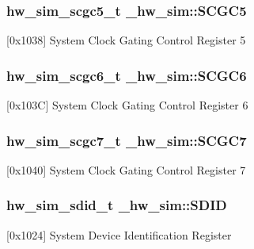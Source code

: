 \subsubsection[{\texorpdfstring{S\+C\+G\+C5}{SCGC5}}]{ {\bf hw\+\_\+sim\+\_\+scgc5\+\_\+t} \+\_\+hw\+\_\+sim\+::\+S\+C\+G\+C5}\hypertarget{struct__hw__sim_a843af5677c002dd091b5fc48eb70382f}{}\label{struct__hw__sim_a843af5677c002dd091b5fc48eb70382f}
\mbox{[}0x1038\mbox{]} System Clock Gating Control Register 5 
\subsubsection[{\texorpdfstring{S\+C\+G\+C6}{SCGC6}}]{ {\bf hw\+\_\+sim\+\_\+scgc6\+\_\+t} \+\_\+hw\+\_\+sim\+::\+S\+C\+G\+C6}\hypertarget{struct__hw__sim_af633c4e971241b6cdbd299cf0a8f6d8c}{}\label{struct__hw__sim_af633c4e971241b6cdbd299cf0a8f6d8c}
\mbox{[}0x103C\mbox{]} System Clock Gating Control Register 6 
\subsubsection[{\texorpdfstring{S\+C\+G\+C7}{SCGC7}}]{ {\bf hw\+\_\+sim\+\_\+scgc7\+\_\+t} \+\_\+hw\+\_\+sim\+::\+S\+C\+G\+C7}\hypertarget{struct__hw__sim_a9ec8adcb8ef628abb3fbaed616ff4b0a}{}\label{struct__hw__sim_a9ec8adcb8ef628abb3fbaed616ff4b0a}
\mbox{[}0x1040\mbox{]} System Clock Gating Control Register 7 
\subsubsection[{\texorpdfstring{S\+D\+ID}{SDID}}]{ {\bf hw\+\_\+sim\+\_\+sdid\+\_\+t} \+\_\+hw\+\_\+sim\+::\+S\+D\+ID}\hypertarget{struct__hw__sim_ac96fe561d9dc3a5114b87a7af41d0699}{}\label{struct__hw__sim_ac96fe561d9dc3a5114b87a7af41d0699}
\mbox{[}0x1024\mbox{]} System Device Identification Register 
